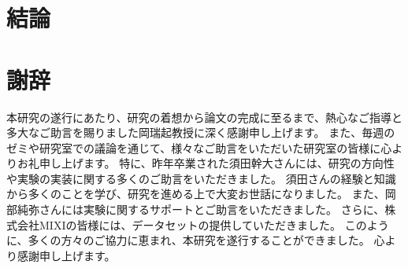 \documentclass[uplatex,11pt,openany]{ujreport}
\renewcommand{\bibname}{参考文献}
\begin{document}
\chapter{結論}


\chapter*{謝辞}
    本研究の遂行にあたり、研究の着想から論文の完成に至るまで、熱心なご指導と多大なご助言を賜りました岡瑞起教授に深く感謝申し上げます。
    また、毎週のゼミや研究室での議論を通じて、様々なご助言をいただいた研究室の皆様に心よりお礼申し上げます。
    特に、昨年卒業された須田幹大さんには、研究の方向性や実験の実装に関する多くのご助言をいただきました。
    須田さんの経験と知識から多くのことを学び、研究を進める上で大変お世話になりました。
    また、岡部純弥さんには実験に関するサポートとご助言をいただきました。
    さらに、株式会社MIXIの皆様には、データセットの提供していただきました。
    このように、多くの方々のご協力に恵まれ、本研究を遂行することができました。
    心より感謝申し上げます。


\newpage


% 
% 





\end{document}

